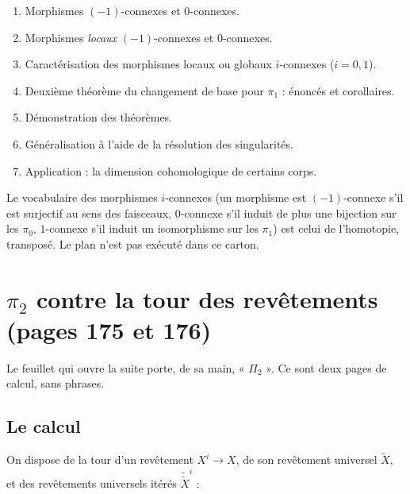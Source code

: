 \documentclass[11pt,a4paper]{article}
\begin{document}
\begin{enumerate}
  \item Morphismes $(-1)$-connexes et $0$-connexes.
  \item Morphismes \emph{locaux} $(-1)$-connexes et $0$-connexes.
  \item Caractérisation des morphismes locaux ou globaux $i$-connexes
    ($i = 0, 1$).
  \item Deuxième théorème du changement de base pour $\pi_{1}$ : énoncés et
    corollaires.
  \item Démonstration des théorèmes.
  \item Généralisation à l'aide de la résolution des singularités.
  \item Application : la dimension cohomologique de certains corps.
\end{enumerate}

Le vocabulaire des morphismes $i$-connexes (un morphisme est $(-1)$-connexe
s'il est surjectif au sens des faisceaux, $0$-connexe s'il induit de plus une
bijection sur les $\pi_{0}$, $1$-connexe s'il induit un isomorphisme sur les
$\pi_{1}$) est celui de l'homotopie, transposé. Le plan n'est pas exécuté
dans ce carton.

\section*{$\pi_{2}$ contre la tour des revêtements (pages 175 et 176)}

Le feuillet qui ouvre la suite porte, de sa main, « $\Pi_{2}$ ». Ce sont deux
pages de calcul, sans phrases.

\subsection*{Le calcul}

On dispose de la tour d'un revêtement $X^{i} \to X$, de son revêtement
universel $\tilde{X}$, et des revêtements universels itérés
$\tilde{\tilde{X}}^{i}$ :

\end{document}
